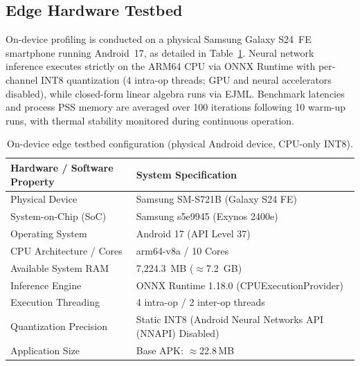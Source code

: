 \subsection{Edge Hardware Testbed}
\label{sec:edge_hardware_testbed}
On-device profiling is conducted on a physical Samsung Galaxy S24~FE smartphone running Android~17, as detailed in Table~\ref{tab:device_spec}. Neural network inference executes strictly on the ARM64 CPU via ONNX Runtime with per-channel INT8 quantization (4 intra-op threads; GPU and neural accelerators disabled), while closed-form linear algebra runs via EJML. Benchmark latencies and process PSS memory are averaged over 100 iterations following 10 warm-up runs, with thermal stability monitored during continuous operation.

\begin{table}[htbp]
\caption{On-device edge testbed configuration (physical Android device, CPU-only INT8).}
\label{tab:device_spec}
\centering
\footnotesize
\begin{tabular}{ll}
\toprule
\textbf{Hardware / Software Property} & \textbf{System Specification} \\
\midrule
Physical Device & Samsung SM-S721B (Galaxy S24 FE) \\
System-on-Chip (SoC) & Samsung s5e9945 (Exynos 2400e) \\
Operating System & Android 17 (API Level 37) \\
CPU Architecture / Cores & arm64-v8a / 10 Cores \\
Available System RAM & 7,224.3~MB ($\approx$7.2~GB) \\
Inference Engine & ONNX Runtime 1.18.0 (CPUExecutionProvider) \\
Execution Threading & 4 intra-op / 2 inter-op threads \\
Quantization Precision & Static INT8 (Android Neural Networks API (NNAPI) Disabled) \\
Application Size & Base APK: $\approx$22.8\,MB \\
\bottomrule
\end{tabular}
\end{table}
